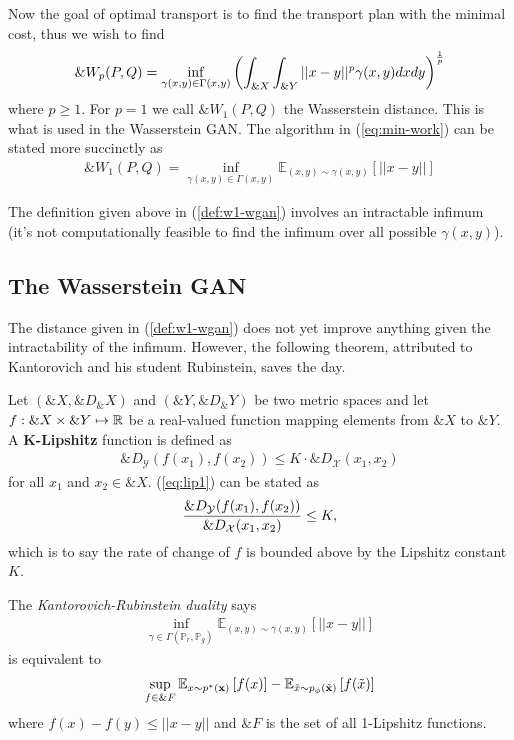 Now the goal of optimal transport is to find the transport plan with
the minimal cost, thus we wish to find
\begin{align}%
  \label{eq:min-work}
  \&W_p(P, Q) = \inf_{\gamma(x,y) \in \Gamma(x,y)} \left( \int_{\&X}\int_{\&Y}||x-y||^p\gamma(x, y)dxdy \right)^{1 \over p}
\end{align}
where $p \geq 1$. For $p = 1$ we call $\&W_1(P, Q)$ the Wasserstein
distance. This is what is used in the Wasserstein GAN. The algorithm
in (\ref{eq:min-work}) can be stated more succinctly as
\begin{align}
  \label{def:w1-wgan}
  \&W_1(P, Q) = \inf_{\gamma(x, y) \in \Gamma(x,y)}\mathbb{E}_{(x,y) \sim \gamma(x, y)} \left[ || x-y || \right]
\end{align}
\begin{remark}
  The definition given above in (\ref{def:w1-wgan}) involves an
  intractable infimum (it's not computationally feasible to find the
  infimum over all possible $\gamma(x, y)$).
\end{remark}

\subsection{The Wasserstein GAN}

The distance given in (\ref{def:w1-wgan}) does not yet improve
anything given the intractability of the infimum. However, the
following theorem, attributed to Kantorovich and his student
Rubinstein, saves the day.

\begin{definition}
  Let $(\&X, \&D_\&X)$ and $(\&Y, \&D_\&Y)$ be two metric spaces and
  let $f: \&X \times \&Y \mapsto \mathbb{R}$ be a real-valued function mapping
  elements from $\&X$ to $\&Y$. A \textbf{K-Lipshitz} function is
  defined as
  \begin{align}
    \label{eq:lip1}
    \&D_{\mathcal{Y}}(f(x_1), f(x_2)) \leq K \cdot {\&D}_{\mathcal{X}}(x_1, x_2)
  \end{align}
  for all $x_1$ and $x_2 \in \&X$. (\ref{eq:lip1}) can be stated as
  \begin{align}
    {\&D_{\mathcal{Y}}(f(x_1), f(x_2)) \over \&D_{\mathcal{X}}(x_1, x_2)} \leq K,
  \end{align}
  which is to say the rate of change of $f$ is bounded above by the
  Lipshitz constant $K$.
\end{definition}

\begin{theorem} The \textit{Kantorovich-Rubinstein duality} says
  \begin{align}
    \inf_{\gamma \in \Gamma(\mathbb{P}_r,
    \mathbb{P}_g)}\mathbb{E}_{(x,y) \sim \gamma(x, y)} \left[ || x-y
    || \right]
  \end{align}
  is equivalent to
  \begin{align} \sup_{f \in \&{F}} \mathbb{E}_{x \sim p^*(\mathbf{x})}\left[ f(x)
    \right] - \mathbb{E}_{\tilde{x} \sim p_{\phi}(\tilde{\mathbf{x}})}\left[ f(\tilde{x}) \right]
  \end{align}
  where $f(x) - f(y) \leq ||x-y||$ and $\&{F}$ is the set of all
  1-Lipshitz functions.
\end{theorem}


